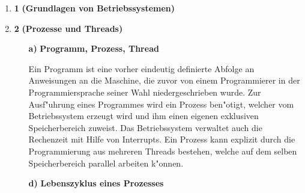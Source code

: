 \documentclass[a4paper,11pt]{article}
\author{\authorinfo}
\title{\titleinfo}
\date{\today}
\begin{document}
\maketitle


\begin {enumerate}
\item[\textbf{1}]
    \textbf{(Grundlagen von Betriebssystemen)}

\item[\textbf{2}]
    \textbf{(Prozesse und Threads)}

    \begin{enumerate}
        \item[\textbf{a)}]
            \textbf{Programm, Prozess, Thread}

            Ein Programm ist eine vorher eindeutig definierte Abfolge an Anweisungen an die Maschine,
            die zuvor von einem Programmierer in der Programmiersprache seiner Wahl niedergeschrieben wurde. Zur Ausf"uhrung eines Programmes wird ein Prozess ben"otigt, welcher vom Betriebssystem erzeugt wird und ihm einen eigenen exklusiven Speicherbereich zuweist.
            Das Betriebssystem verwaltet auch die Rechenzeit mit Hilfe von Interrupts. 
            Ein Prozess kann explizit durch die Programmierung aus mehreren Threads bestehen, welche auf dem selben Speicherbereich parallel arbeiten k"onnen.

        \item[\textbf{d)}]
            \textbf{Lebenszyklus eines Prozesses}



\end{enumerate}
\end{enumerate}
\end{document}
